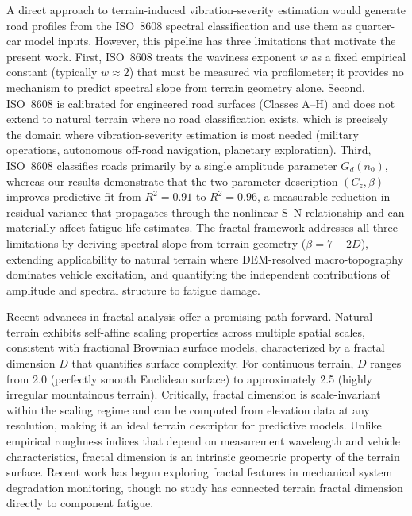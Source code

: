 \documentclass[11pt]{article}
\begin{document}
A direct approach to terrain-induced vibration-severity estimation would generate road profiles from the ISO~8608 spectral classification\cite{ISO8608} and use them as quarter-car model inputs. However, this pipeline has three limitations that motivate the present work. First, ISO~8608 treats the waviness exponent $w$ as a fixed empirical constant (typically $w \approx 2$) that must be measured via profilometer; it provides no mechanism to predict spectral slope from terrain geometry alone. Second, ISO~8608 is calibrated for engineered road surfaces (Classes A--H) and does not extend to natural terrain where no road classification exists, which is precisely the domain where vibration-severity estimation is most needed (military operations, autonomous off-road navigation, planetary exploration). Third, ISO~8608 classifies roads primarily by a single amplitude parameter $G_d(n_0)$, whereas our results demonstrate that the two-parameter description $(C_z, \beta)$ improves predictive fit from $R^2 = 0.91$ to $R^2 = 0.96$, a measurable reduction in residual variance that propagates through the nonlinear S--N relationship and can materially affect fatigue-life estimates. The fractal framework addresses all three limitations by deriving spectral slope from terrain geometry ($\beta = 7-2D$), extending applicability to natural terrain where DEM-resolved macro-topography dominates vehicle excitation, and quantifying the independent contributions of amplitude and spectral structure to fatigue damage.

Recent advances in fractal analysis offer a promising path forward. Natural terrain exhibits self-affine scaling properties across multiple spatial scales\cite{Mandelbrot1982,Sayles1978,Persson2005}, consistent with fractional Brownian surface models\cite{MandelbrotVanNess1968,Mandelbrot1982}, characterized by a fractal dimension $D$ that quantifies surface complexity. For continuous terrain, $D$ ranges from 2.0 (perfectly smooth Euclidean surface) to approximately 2.5 (highly irregular mountainous terrain). Critically, fractal dimension is scale-invariant within the scaling regime and can be computed from elevation data at any resolution, making it an ideal terrain descriptor for predictive models. Unlike empirical roughness indices that depend on measurement wavelength and vehicle characteristics, fractal dimension is an intrinsic geometric property of the terrain surface. Recent work has begun exploring fractal features in mechanical system degradation monitoring\cite{KrejcarNamazi2025}, though no study has connected terrain fractal dimension directly to component fatigue.
\end{document}
